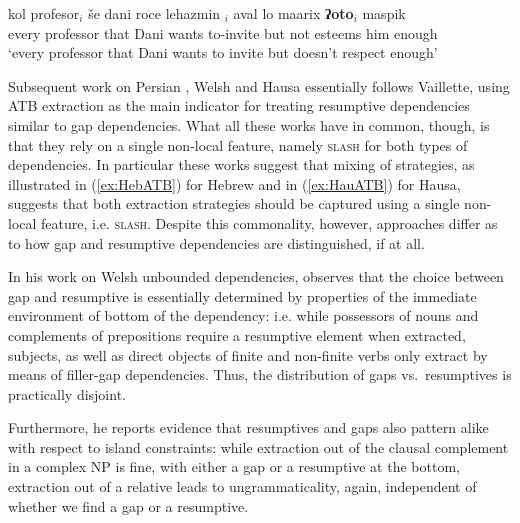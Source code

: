 \documentclass[output=paper
                ,modfonts
                ,nonflat
	        ,collection
	        ,collectionchapter
	        ,collectiontoclongg
 	        ,biblatex
                ,babelshorthands
                ,newtxmath
                ,draftmode
                ,colorlinks, citecolor=brown
]{./langsci/langscibook}
\begin{document}
{\begin{exe}
  \ex \label{ex:HebATB}{\gll kol
profesor$_i$ še dani roce lehazmin \gap{}$_i$ aval lo maarix \textbf{ʔoto}$_i$ maspik
\\
every professor that Dani wants to-invite {} but not
esteems him enough\\
\glt `every professor that Dani wants to invite but doesn’t respect
enough'\hfill\citep[78]{sells_p84}}
\end{exe}

\noindent
Subsequent work on Persian \citep{taghvaipour:phd:05}, Welsh
\citep{Borsley:13} and Hausa \citep{Crysmann:12} essentially follows
Vaillette, using ATB extraction as the main indicator for treating
resumptive dependencies similar to gap dependencies. What all these
works have in common, though, is that they rely on a single non-local
feature, namely \textsc{slash} for both types of dependencies. In
particular these works suggest that mixing of strategies, as
illustrated in (\ref{ex:HebATB}) for Hebrew and in (\ref{ex:HauATB})
for Hausa, suggests that both extraction
strategies should be captured using a single non-local feature,
i.e. \textsc{slash}. Despite this commonality, however, approaches
differ as to how gap and resumptive dependencies are distinguished, if
at all.

In his work on Welsh unbounded dependencies, \citet{Borsley:10}
observes that the choice between gap and resumptive is essentially
determined by properties of the immediate environment of bottom of the
dependency: i.e. while possessors of nouns and complements of
prepositions require a resumptive element when extracted, subjects, as
well as direct objects of finite and non-finite verbs only extract by
means of filler-gap dependencies. Thus, the distribution of gaps vs.\
resumptives is practically disjoint.

Furthermore, he reports evidence that resumptives and gaps also
pattern alike with respect to island constraints: while extraction out
of the clausal complement in a complex NP is fine, with either a gap
or a resumptive at the bottom, extraction out of a relative leads to
ungrammaticality, again, independent of whether we find a gap or a
resumptive.

}
\end{document}
